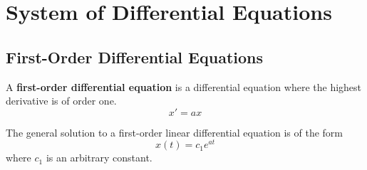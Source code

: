 \documentclass{article}
\begin{document}
\section{System of Differential Equations}
\subsection{First-Order Differential Equations}
\begin{definition}
    A \textbf{first-order differential equation} is a differential
    equation where the highest derivative is of order one.
    \begin{equation*}
        x' = a x
    \end{equation*}
\end{definition}
\begin{theorem}
    The general solution to a first-order linear differential equation
    is of the form
    \begin{equation*}
        x(t) = c_1 e^{a t}
    \end{equation*}
    where \(c_1\) is an arbitrary constant.
\end{theorem}
\end{document}
